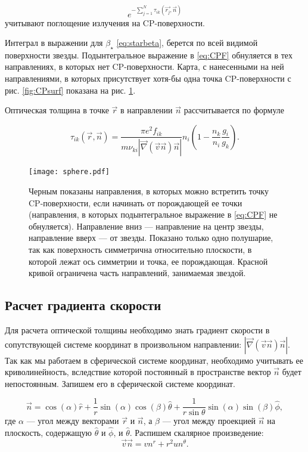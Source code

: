 \documentclass{article}
\begin{document}
 \[e^{-\sum_{j=1}^N\tau_{ik}(\vec{r_j},\vec{n})}\]
учитывают поглощение излучения на CP-поверхности.

Интеграл в выражении для $\beta_\star$ \eqref{eq:starbeta}, берется по всей видимой поверхности звезды. Подынтегральное выражение в \eqref{eq:CPF} обнуляется в тех направлениях, в которых нет CP-поверхности. Карта, с нанесенными на ней направлениями, в которых присутствует хотя-бы одна точка CP-поверхности с рис. \ref{fig:CPsurf} показана на рис. \ref{fig:CPmap}.  

Оптическая толщина в точке $\vec{r}$ в направлении $\vec{n}$ рассчитывается по формуле 

\begin{equation} \label{eq:optdepth}
\tau_{ik}(\vec{r},\vec{n}) = \frac{\pi e^2 f_{ik}}{m \nu_{ki} |\vec{\nabla} (\vec{v}\vec{n})\vec{n}|} n_i \left( 1 - \frac{n_k}{n_i}\frac{g_i}{g_k} \right).
\end{equation} 


\begin{figure}
\centering
\texttt{[image: sphere.pdf]}
\caption{Черным показаны направления, в которых можно встретить точку CP-поверхности, если начинать от порождающей ее точки (направления, в которых подынтегральное выражение в \eqref{eq:CPF} не обнуляется). Направление вниз --- направление на центр звезды, направление вверх --- от звезды. Показано только одно полушарие, так как поверхность симметрична относительно плоскости, в которой лежат ось симметрии и точка, ее порождающая. Красной кривой ограничена часть направлений, занимаемая звездой.}
\label{fig:CPmap}
\end{figure}

\newpage

\subsection{Расчет градиента скорости}

Для расчета оптической толщины необходимо знать градиент скорости в сопутствующей системе координат в произвольном направлении: $|\vec{\nabla} (\vec{v}\vec{n})\vec{n}|$. Так как мы работаем в сферической системе координат, необходимо учитывать ее криволинейность, вследствие которой постоянный в пространстве вектор $\vec{n}$ будет непостоянным. Запишем его в сферической системе координат.

\[
\vec{n} = \cos(\alpha)\hat{r} + \frac{1}{r}\sin(\alpha)\cos(\beta)\hat{\theta} + \frac{1}{r\sin\theta}\sin(\alpha)\sin(\beta)\hat{\phi},
\] 
где $\alpha$ --- угол между векторами $\vec{r}$ и $\vec{n}$, а $\beta$ --- угол между проекцией $\vec{n}$ на плоскость, содержащую $\hat{\theta}$ и $\hat{\phi}$, и $\hat{\theta}$. Распишем скалярное произведение:
\[
\vec{v}\vec{n} = vn^r + r^2 u n^\theta.
\]
\end{document}
